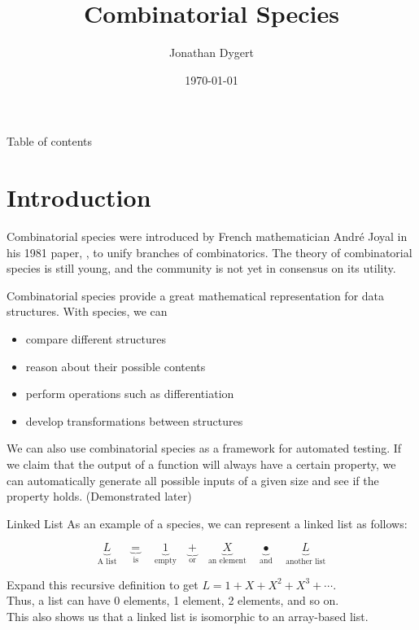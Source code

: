 \documentclass{beamer}
\title{Combinatorial Species}
\author{Jonathan Dygert}
\date{\today}
\begin{document}
\frame{\titlepage}

\begin{frame}{Table of contents}
  \tableofcontents
\end{frame}

\section{Introduction}
\begin{frame}
  Combinatorial species were introduced by French mathematician Andr\'e Joyal in his 1981 paper,
  , to unify branches of combinatorics. The theory of combinatorial species is
  still young, and the community is not yet in consensus on its utility.
\end{frame}

\begin{frame}
  Combinatorial species provide a great mathematical representation for data structures.
  With species, we can
  \begin{itemize}
    \item compare different structures
    \item reason about their possible contents
    \item perform operations such as differentiation
    \item develop transformations between structures
  \end{itemize}
  We can also use combinatorial species as a framework for automated testing. If we claim that the
  output of a function will always have a certain property, we can automatically generate all
  possible inputs of a given size and see if the property holds. (Demonstrated later)
\end{frame}

\begin{frame}{Linked List}
  As an example of a species, we can represent a linked list as follows:
  \begin{block}{}
    \[
      \underbrace{L}_\text{A list} \quad
      \underbrace{=}_\text{is} \quad
      \underbrace{1}_\text{empty} \quad
      \underbrace{+}_\text{or} \quad
      \underbrace{X}_\text{an element} \quad
      \underbrace{\bullet}_\text{and} \quad
      \underbrace{L}_\text{another list}
    \]
  \end{block}
  Expand this recursive definition to get \( L = 1 + X + X^2 + X^3 + \cdots \). \\
  Thus, a list can have 0 elements, 1 element, 2 elements, and so on. \\
  This also shows us that a linked list is isomorphic to an array-based list.
\end{frame}
\end{document}
